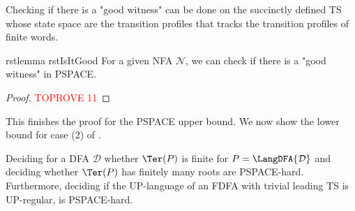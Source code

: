 \documentclass[a4paper,USenglish,cleveref,autoref,thm-restate]{lipics-v2021}
\newcommand{\mc}[1]{\ensuremath{\mathcal{#1}}}
\newcommand{\N}{\mc{N}}
\newcommand{\D}{\mc{D}}
\newcommand{\PSPACE}{\textsf{PSPACE}\xspace}
\begin{document}
Checking if there is a "good witness" can be done on the succinctly defined TS whose state space are the transition profiles that tracks the transition profiles of finite words.

\begin{restatable}{rstlemma}
  {rstIsItGood}
  \label{lem:InPSPACE}
  For a given NFA $\N$, we can check if there is a "good witness" in \PSPACE.
\end{restatable}

\begin{proof}\textcolor{red}{TOPROVE 11}\end{proof}






\iffalse
  \begin{restatable}{rstlemma}{rstdifferent}
    \label{lem:different}
    If $x,y$ are different words of equal length $\ell=|x|=|y|$ and $p>2\ell$ is a prime number, then $x \cdot y^{p-1}$ is a root.

    Moreover, if $\tau$ is a "rejecting" transition profile and both $\tpN(x)$ and $\tpN(y)$ are powers of $\tau$, then $\tpN(x\cdot y^{p-1})$ is "rejecting" and $x\cdot y^{p-1} \notin \Pow{P}$.
  \end{restatable}

  \begin{proof}[Proof (sketch)]
    If $u$ is a shorter root with $|u|<p\cdot\ell$, then either $r=|u|$ divides $\ell$, in which case $x=y=u^{\ell/r}$ holds, or $p$ divides $r$, but then $x$ is repeated after $r$ letters, $y$ after $r+\ell$ letters, and they must be the same shift of $y$ and thus equal. \hfill (contradiction)

    For the second part, being a power of $\tau$ is closed under powers and concatenation.
  \end{proof}
\fi

This finishes the proof for the \PSPACE upper bound. We now show the lower bound for case (2) of .


\begin{theorem} \label{thm:regularity-hard}
  Deciding for a DFA $\D$ whether $\Ter(P)$ is finite for $P=\LangDFA{\D}$ and deciding whether $\Ter(P)$ has finitely many roots are \PSPACE-hard. Furthermore, deciding if the UP-language of an FDFA with trivial leading TS is UP-regular, is \PSPACE-hard.
\end{theorem}
\end{document}
